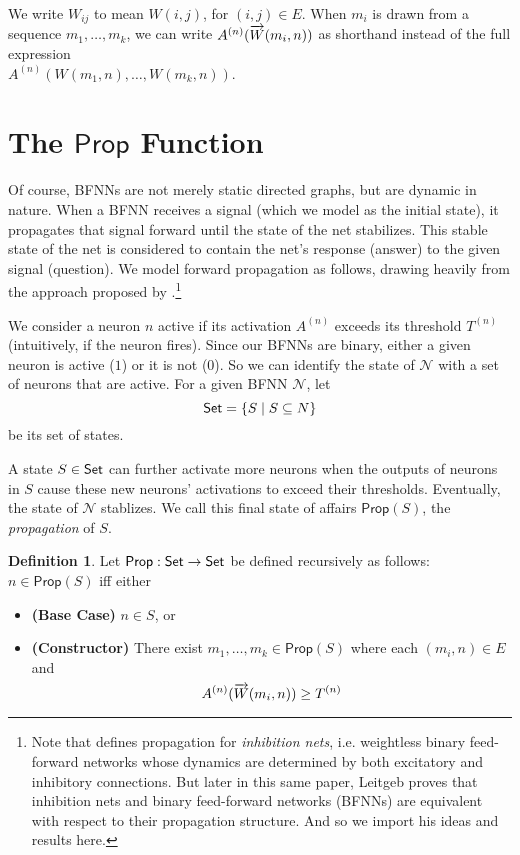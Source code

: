 \documentclass[12pt]{article}
\newcommand{\Set}{\mbox{\sf Set}}
\theoremstyle{definition}
\newtheorem{definition}{Definition}
\newcommand{\set}[1]{\{ #1 \}}
\newcommand{\Prop}{\textsf{Prop}}
\newcommand{\Net}{\mathcal{N}}
\begin{document}
We write $W_{ij}$ to mean $W(i,j)$, for ${(i, j) \in E}$.  When $m_i$ is drawn from a sequence ${m_1, \ldots, m_k}$, we can write ${A^{(n)}(\smash{\overrightarrow{W}}(m_i, n))}$ as shorthand instead of the full expression\\ $A^{(n)}(W(m_1, n), \ldots, W(m_k, n))$.


\section{\textcolor{myblue}{The $\Prop$ Function}}
Of course, BFNNs are not merely static directed graphs, but are dynamic in nature.  When a BFNN receives a signal (which we model as the initial state), it propagates that signal forward until the state of the net stabilizes.  This stable state of the net is considered to contain the net's response (answer) to the given signal (question).  We model forward propagation as follows, drawing heavily from the approach proposed by \cite{leitgeb2001nonmonotonic,leitgeb2018neural}.\footnote{Note that \cite{leitgeb2001nonmonotonic,leitgeb2018neural} defines propagation for \emph{inhibition nets}, i.e. weightless binary feed-forward networks whose dynamics are determined by both excitatory and inhibitory connections.  But later in this same paper, Leitgeb proves that inhibition nets and binary feed-forward networks (BFNNs) are equivalent with respect to their propagation structure.  And so we import his ideas and results here.}  

We consider a neuron $n$ active if its activation $A^{(n)}$ exceeds its threshold $T^{(n)}$ (intuitively, if the neuron fires).  Since our BFNNs are binary, either a given neuron is active ($1$) or it is not ($0$).  So we can identify the state of $\Net$ with a set of neurons that are active.  For a given BFNN $\Net$, let
\[
    \Set = \set{S \mid S \subseteq N}
\]
be its set of states.

A state $S \in \Set$ can further activate more neurons when the outputs of neurons in $S$ cause these new neurons' activations to exceed their thresholds.  Eventually, the state of $\Net$ stablizes.  We call this final state of affairs $\Prop(S)$, the \emph{propagation} of $S$.

\begin{definition}
Let $\Prop : \Set \to \Set$ be defined recursively as follows:  $n \in \Prop(S)$ iff either
\begin{itemize}
    \item[] \textbf{(Base Case)} $n \in S$, or
    \item[] \textbf{(Constructor)} There exist $m_1, \ldots, m_k \in \Prop(S)$ where each $(m_i, n) \in E$ and
    \[
    A^{(n)}(\smash{\overrightarrow{W}}(m_i, n)) \geq T^{(n)}
    \]
\end{itemize}
\end{definition}
\end{document}
